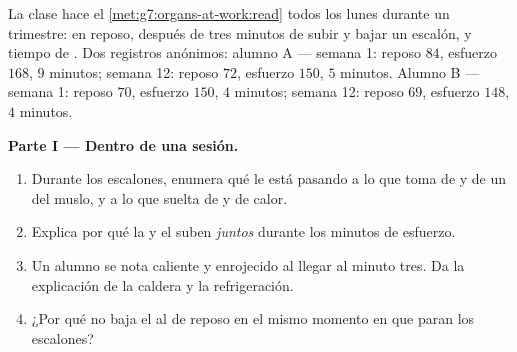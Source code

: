 \begin{problem}\label{pb:g7:organs-at-work:1}
La clase hace el \cref{met:g7:organs-at-work:read} todos los lunes
durante un trimestre:  en reposo,  después de tres minutos de
subir y bajar un escalón, y tiempo de . Dos registros
anónimos: alumno A --- semana 1: reposo $84$, esfuerzo $168$,
 $9$ minutos; semana 12: reposo $72$, esfuerzo $150$,
 $5$ minutos. Alumno B --- semana 1: reposo $70$, esfuerzo
$150$,  $4$ minutos; semana 12: reposo $69$, esfuerzo
$148$,  $4$ minutos.

\medskip\noindent\textbf{Parte I --- Dentro de una sesión.}
\begin{enumerate}
  \item Durante los escalones, enumera qué le está pasando a lo que
        toma de  y de  un  del muslo, y a lo que
        suelta de  y de calor.
  \item Explica por qué la  y el  suben \emph{juntos}
        durante los minutos de esfuerzo.
  \item Un alumno se nota caliente y enrojecido al llegar al minuto
        tres. Da la explicación de la caldera y la refrigeración.
  \item ¿Por qué no baja el  al de reposo en el mismo momento en
        que paran los escalones?
\end{enumerate}


\end{problem}
